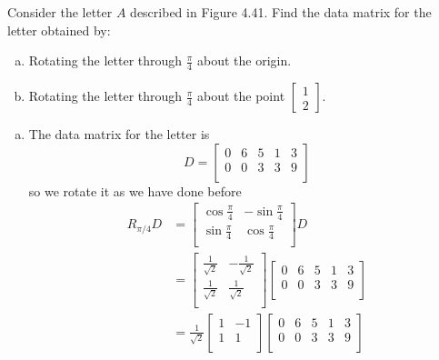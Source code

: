 \documentclass[../main.tex]{subfiles}
\begin{document}
Consider the letter $A$ described in Figure 4.41.
Find the data matrix for the letter obtained by:
\begin{enumerate}[a)]
	\item Rotating the letter through \(\frac{\pi}{4}\) about the origin.
	\item Rotating the letter through \(\frac{\pi}{4}\) about the point \(\begin{bmatrix}1\\2\end{bmatrix}\).
\end{enumerate}

\solution
\begin{enumerate}[a)]
	\item The data matrix for the letter is
		\[
			D
			=
			\begin{bmatrix}
				0 & 6 & 5 & 1 & 3 \\
				0 & 0 & 3 & 3 & 9 \\
			\end{bmatrix}
		\]
		so we rotate it as we have done before
		\begin{align*}
			R_{\pi/4}D
			&=
			\begin{bmatrix}
				\cos\frac{\pi}{4} & -\sin\frac{\pi}{4} \\
				\sin\frac{\pi}{4} & \cos\frac{\pi}{4} \\
			\end{bmatrix}
			D
			\\&=
			\begin{bmatrix}
				\frac{1}{\sqrt{2}} & -\frac{1}{\sqrt{2}} \\
				\frac{1}{\sqrt{2}} & \frac{1}{\sqrt{2}} \\
			\end{bmatrix}
			\begin{bmatrix}
				0 & 6 & 5 & 1 & 3 \\
				0 & 0 & 3 & 3 & 9 \\
			\end{bmatrix}
			\\&=
			\frac{1}{\sqrt{2}}
			\begin{bmatrix}
				1 & -1 \\
				1 & 1 \\
			\end{bmatrix}
			\begin{bmatrix}
				0 & 6 & 5 & 1 & 3 \\
				0 & 0 & 3 & 3 & 9 \\
			\end{bmatrix}

\end{align*}
\end{enumerate}
\end{document}
